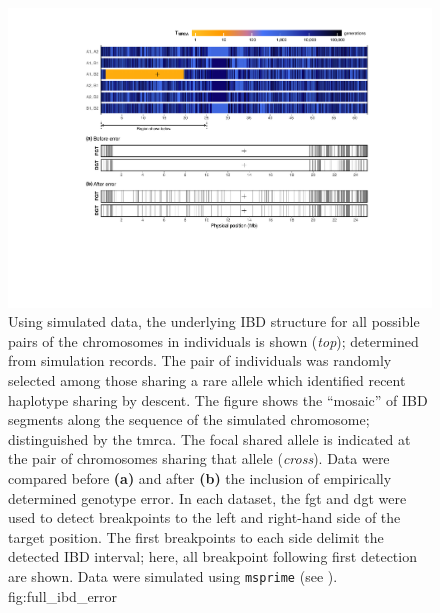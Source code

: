 

\begin{figure}[!htb]
\includegraphics[width=\textwidth]{./img/ch4/full_ibd_error}
{Using simulated data, the underlying IBD structure for all  possible pairs of the  chromosomes in  individuals is shown (\emph{top}); determined from simulation records.
The pair of individuals was randomly selected among those sharing a rare allele which identified recent haplotype sharing by descent.
The figure shows the ``mosaic'' of IBD segments along the sequence of the simulated chromosome; distinguished by the \gls{tmrca}.
The focal shared allele is indicated at the pair of chromosomes sharing that allele (\emph{cross}).
Data were compared before \textbf{(a)} and after \textbf{(b)} the inclusion of empirically determined genotype error.
In each dataset, the \gls{fgt} and \gls{dgt} were used to detect breakpoints to the left and right-hand side of the target position.
The first breakpoints to each side delimit the detected IBD interval; here, all breakpoint following first detection are shown.
Data were simulated using \texttt{msprime} (see ).}
{fig:full_ibd_error}
\end{figure}
